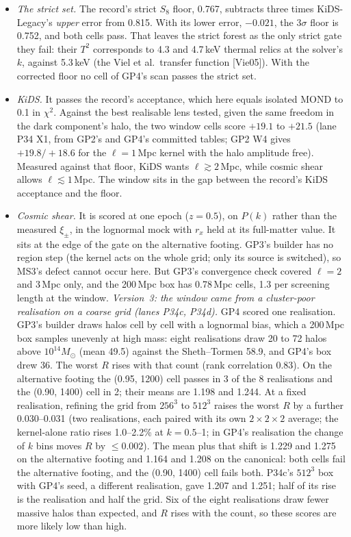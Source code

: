 \documentclass[10pt]{article}
\begin{document}
\begin{itemize}
\item \emph{The strict set.} The record's strict $S_8$ floor, 0.767, subtracts three times KiDS-Legacy's \emph{upper} error from 0.815. With its lower error, $-0.021$, the $3\sigma$ floor is 0.752, and both cells pass. That leaves the strict forest as the only strict gate they fail: their $T^2$ corresponds to 4.3 and 4.7\,keV thermal relics at the solver's $k$, against 5.3\,keV (the Viel et al.\ transfer function [Vie05]). With the corrected floor no cell of GP4's scan passes the strict set.
\item \emph{KiDS.} It passes the record's acceptance, which here equals isolated MOND to 0.1 in $\chi^2$. Against the best realisable lens tested, given the same freedom in the dark component's halo, the two window cells score $+19.1$ to $+21.5$ (lane P34 X1, from GP2's and GP4's committed tables; GP2 W4 gives $+19.8/+18.6$ for the $\ell=1$\,Mpc kernel with the halo amplitude free). Measured against that floor, KiDS wants $\ell\gtrsim2$\,Mpc, while cosmic shear allows $\ell\lesssim1$\,Mpc. The window sits in the gap between the record's KiDS acceptance and the floor.
\item \emph{Cosmic shear.} It is scored at one epoch ($z=0.5$), on $P(k)$ rather than the measured $\xi_\pm$, in the lognormal mock with $r_x$ held at its full-matter value. It sits at the edge of the gate on the alternative footing. GP3's builder has no region step (the kernel acts on the whole grid; only its source is switched), so MS3's defect cannot occur here. But GP3's convergence check covered $\ell=2$ and 3\,Mpc only, and the 200\,Mpc box has 0.78\,Mpc cells, 1.3 per screening length at the window. \emph{Version~3: the window came from a cluster-poor realisation on a coarse grid (lanes P34c, P34d).} GP4 scored one realisation. GP3's builder draws halos cell by cell with a lognormal bias, which a 200\,Mpc box samples unevenly at high mass: eight realisations draw 20 to 72 halos above $10^{14}M_\odot$ (mean 49.5) against the Sheth--Tormen 58.9, and GP4's box drew 36. The worst $R$ rises with that count (rank correlation 0.83). On the alternative footing the (0.95, 1200) cell passes in 3 of the 8 realisations and the (0.90, 1400) cell in 2; their means are 1.198 and 1.244. At a fixed realisation, refining the grid from $256^3$ to $512^3$ raises the worst $R$ by a further 0.030--0.031 (two realisations, each paired with its own $2\times2\times2$ average; the kernel-alone ratio rises 1.0--2.2\% at $k=0.5$--1; in GP4's realisation the change of $k$ bins moves $R$ by $\leq0.002$). The mean plus that shift is 1.229 and 1.275 on the alternative footing and 1.164 and 1.208 on the canonical: both cells fail the alternative footing, and the (0.90, 1400) cell fails both. P34c's $512^3$ box with GP4's seed, a different realisation, gave 1.207 and 1.251; half of its rise is the realisation and half the grid. Six of the eight realisations draw fewer massive halos than expected, and $R$ rises with the count, so these scores are more likely low than high.

\end{itemize}
\end{document}
